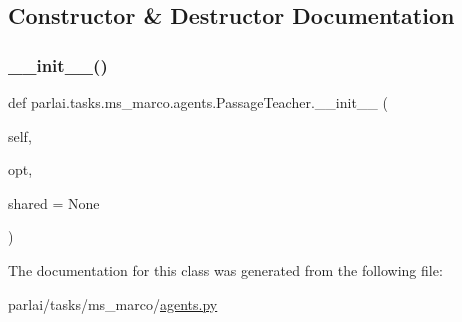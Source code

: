 \subsection{Constructor \& Destructor Documentation}
\mbox{\label{classparlai_1_1tasks_1_1ms__marco_1_1agents_1_1PassageTeacher_a94976bd31fa3b9da0ea1c7625b22c382}} 
\subsubsection{\texorpdfstring{\+\_\+\+\_\+init\+\_\+\+\_\+()}{\_\_init\_\_()}}
{\footnotesize\ttfamily def parlai.\+tasks.\+ms\+\_\+marco.\+agents.\+Passage\+Teacher.\+\_\+\+\_\+init\+\_\+\+\_\+ (\begin{DoxyParamCaption}\item[{}]{self,  }\item[{}]{opt,  }\item[{}]{shared = {\ttfamily None} }\end{DoxyParamCaption})}



The documentation for this class was generated from the following file\+:\begin{DoxyCompactItemize}
\item 
parlai/tasks/ms\+\_\+marco/\hyperlink{parlai_2tasks_2ms__marco_2agents_8py}{agents.\+py}\end{DoxyCompactItemize}
